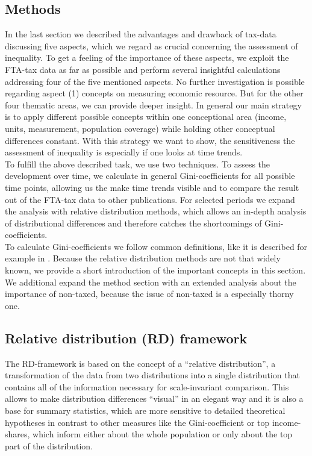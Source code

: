 \documentclass[twoside]{article}\usepackage[]{graphicx}\usepackage[]{color}
\begin{document}
\begin{multicols}{2}
\section{Methods}



In the last section we described the advantages and drawback of tax-data discussing five aspects, which we regard as crucial concerning the assessment of inequality. To get a feeling of the importance of these aspects, we exploit the FTA-tax data as far as possible and perform several insightful calculations addressing four of the five mentioned aspects. No further investigation is possible regarding aspect (1) concepts on measuring economic resource. But for the other four thematic areas, we can provide deeper insight. In general our main strategy is to apply different possible concepts within one conceptional area (income, units, measurement, population coverage) while holding other conceptual differences constant. With this strategy we want to show, the sensitiveness the assessment of inequality is especially if one looks at time trends.\\

To fulfill the above described task, we use two techniques. To assess the development over time, we calculate in general Gini-coefficients for all possible time points, allowing us the make time trends visible and to compare the result out of the FTA-tax data to other publications. For selected periods we expand the analysis with relative distribution methods, which allows an in-depth analysis of distributional differences and therefore catches the shortcomings of Gini-coefficients. \\

To calculate Gini-coefficients we follow common definitions, like it is described for example in \citep{jann_einfuhrung_2005}. Because the relative distribution methods are not that widely known, we provide a short introduction of the important concepts in this section. We additional expand the method section with an extended analysis about the importance of non-taxed, because the issue of non-taxed is a especially thorny one.


\subsection{Relative distribution (RD) framework}

The RD-framework is based on the concept of a ``relative distribution'', a transformation of the data from two distributions into a single distribution that contains all of the information necessary for scale-invariant comparison. This allows to make distribution differences ``visual'' in an elegant way and it is also a base for summary statistics, which are more sensitive to detailed theoretical hypotheses in contrast to other measures like the Gini-coefficient or top income-shares, which inform either about the whole population or only about the top part of the distribution.\\


\end{multicols}
\end{document}
